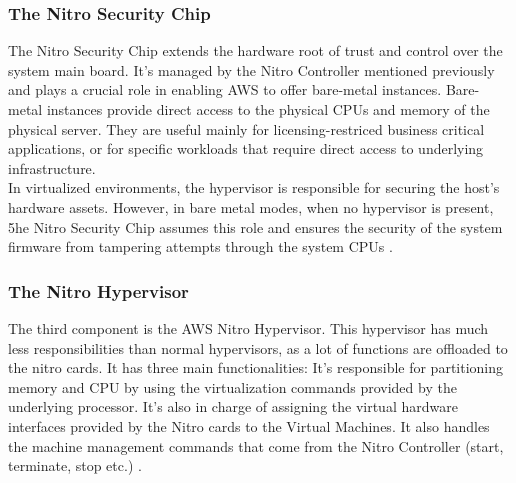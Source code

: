 \subsubsection{The Nitro Security Chip}
The Nitro Security Chip extends the hardware root of trust and control over the system main board. It's 
managed by the Nitro Controller mentioned previously and plays a crucial role in enabling 
AWS to offer bare-metal instances. Bare-metal instances provide direct access to the physical CPUs and memory 
of the physical server. They are useful mainly for licensing-restriced business critical applications, or for 
specific workloads that require direct access to underlying infrastructure. \\ 
In virtualized environments, the hypervisor is responsible for securing the host's hardware assets. 
However, in bare metal modes, when no hypervisor is present, 5he Nitro Security Chip 
assumes this role and ensures the security of the system firmware from tampering attempts through the system 
CPUs \cite{nitro_whitepaper}. 

\subsubsection{The Nitro Hypervisor}
The third component is the AWS Nitro Hypervisor. This hypervisor has much less responsibilities than normal 
hypervisors, as a lot of functions are offloaded to the nitro cards. It has three main functionalities: 
It's responsible for partitioning memory and CPU by using the virtualization commands provided by the 
underlying processor. It's also in charge of assigning the virtual hardware interfaces provided by 
the Nitro cards to the Virtual Machines. It also handles the machine management commands that come from 
the Nitro Controller (start, terminate, stop etc.) \cite{nitro_whitepaper}. 

